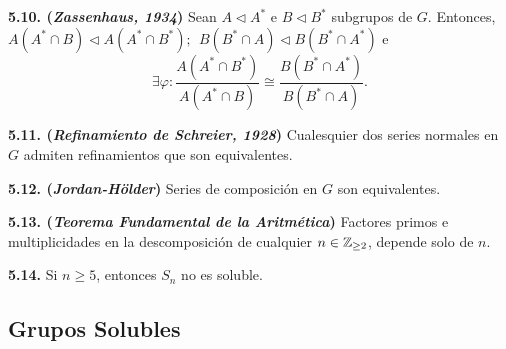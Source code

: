 \begin{lemma}
    \textbf{5.10. (\emph{Zassenhaus, 1934})} Sean \(A \lhd A^* \) e \(B \lhd B^*\) subgrupos de \(G\). Entonces, \(A (A^* \cap B) \lhd A(A^* \cap B^*); \ \  B (B^* \cap A) \lhd B(B^* \cap A^*)\) e
    \[\exists \varphi : \displaystyle \frac{A(A^*\cap B^*)}{A(A^*\cap B)} \cong \frac{B(B^*\cap A^*)}{B(B^*\cap A)} .\]
\end{lemma}

\vspace{-0.3cm}

\hypertarget{thm511}{}
\begin{theorem}
    \textbf{5.11. (\emph{Refinamiento de Schreier, 1928})} Cualesquier dos series normales en \(G\) admiten refinamientos que son equivalentes.  
\end{theorem}

\begin{theorem}
    \textbf{5.12. (\emph{Jordan-Hölder})} Series de composición en \(G\) son equivalentes.  
\end{theorem}

\begin{corollary}
    \textbf{5.13. (\emph{Teorema Fundamental de la Aritmética})} Factores primos e multiplicidades en la descomposición de cualquier \(n\in \mathbb{Z}_{\geq 2}\), depende solo de \(n\).    
\end{corollary}


\begin{theorem}
    \textbf{5.14.} Si \(n\geq 5\), entonces \(S_n\) no es soluble. 
\end{theorem}

\subsection*{Grupos Solubles}    

